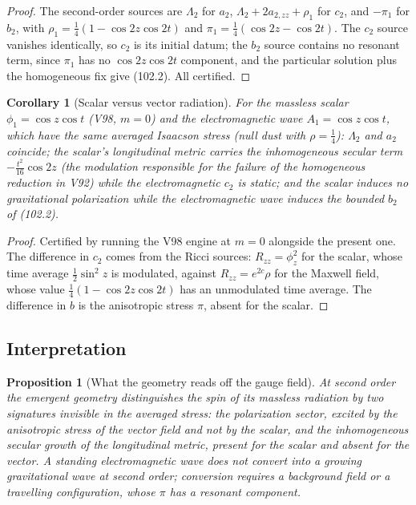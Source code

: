 \documentclass[11pt]{article}
\newtheorem{proposition}[theorem]{Proposition}
\newtheorem{corollary}[theorem]{Corollary}
\theoremstyle{remark}
\begin{document}
\begin{proof}
The second-order sources are \(\Lambda_2\) for \(a_2\),
\(\Lambda_2+2a_{2,zz}+\rho_1\) for \(c_2\), and \(-\pi_1\) for
\(b_2\), with \(\rho_1=\tfrac14(1-\cos2z\cos2t)\) and
\(\pi_1=\tfrac14(\cos2z-\cos2t)\).  The \(c_2\) source vanishes
identically, so \(c_2\) is its initial datum; the \(b_2\) source
contains no resonant term, since \(\pi_1\) has no \(\cos2z\cos2t\)
component, and the particular solution plus the homogeneous fix give
(102.2).  All certified.
\end{proof}

\begin{corollary}[Scalar versus vector radiation]
\label{cor:v19v99-comparison}
For the massless scalar \(\phi_1=\cos z\cos t\) (V98, \(m=0\)) and the
electromagnetic wave \(A_1=\cos z\cos t\), which have the same
averaged Isaacson stress (null dust with \(\rho=\tfrac14\)):
\(\Lambda_2\) and \(a_2\) coincide; the scalar's longitudinal metric
carries the inhomogeneous secular term \(-\tfrac{t^2}{16}\cos2z\)
(the modulation responsible for the failure of the homogeneous
reduction in V92) while the electromagnetic \(c_2\) is static; and
the scalar induces no gravitational polarization while the
electromagnetic wave induces the bounded \(b_2\) of (102.2).
\end{corollary}

\begin{proof}
Certified by running the V98 engine at \(m=0\) alongside the
present one.  The difference in \(c_2\) comes from the Ricci
sources: \(R_{zz}=\phi_z^2\) for the scalar, whose time average
\(\tfrac12\sin^2z\) is modulated, against \(R_{zz}=e^{2c}\rho\) for the
Maxwell field, whose value \(\tfrac14(1-\cos2z\cos2t)\) has an
unmodulated time average.  The difference in \(b\) is the anisotropic
stress \(\pi\), absent for the scalar.
\end{proof}

\subsection{Interpretation}

\begin{proposition}[What the geometry reads off the gauge field]
\label{prop:v19v99-reading}
At second order the emergent geometry distinguishes the spin of its
massless radiation by two signatures invisible in the averaged stress:
the polarization sector, excited by the anisotropic stress of the
vector field and not by the scalar, and the inhomogeneous secular
growth of the longitudinal metric, present for the scalar and absent
for the vector.  A standing electromagnetic wave does not convert into
a growing gravitational wave at second order; conversion requires a
background field or a travelling configuration, whose \(\pi\) has a
resonant component.
\end{proposition}
\end{document}
